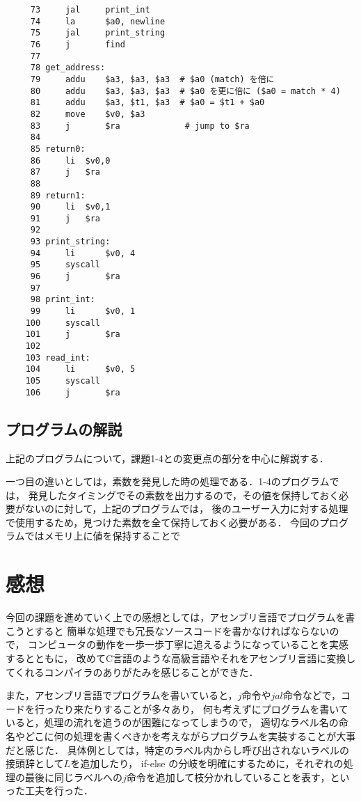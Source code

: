 \documentclass[a4j,11pt]{jarticle}
\begin{document}
\begin{verbatim}
     73	    jal     print_int
     74	    la      $a0, newline
     75	    jal     print_string
     76	    j       find
     77	
     78	get_address:
     79	    addu    $a3, $a3, $a3  # $a0 (match) を倍に
     80	    addu    $a3, $a3, $a3  # $a0 を更に倍に ($a0 = match * 4)
     81	    addu    $a3, $t1, $a3  # $a0 = $t1 + $a0
     82	    move    $v0, $a3
     83	    j		$ra				# jump to $ra
     84	    
     85	return0:
     86		li	$v0,0
     87		j	$ra
     88	
     89	return1:
     90		li	$v0,1
     91		j	$ra
     92	
     93	print_string:
     94	    li      $v0, 4
     95	    syscall
     96	    j       $ra
     97	
     98	print_int:
     99	    li      $v0, 1
    100	    syscall
    101	    j       $ra
    102	
    103	read_int:
    104	    li		$v0, 5
    105	    syscall
    106	    j       $ra 
\end{verbatim}

\subsection{プログラムの解説}
上記のプログラムについて，課題1-4との変更点の部分を中心に解説する．

一つ目の違いとしては，素数を発見した時の処理である．1-4のプログラムでは，
発見したタイミングでその素数を出力するので，その値を保持しておく必要がないのに対して，上記のプログラムでは，
後のユーザー入力に対する処理で使用するため，見つけた素数を全て保持しておく必要がある．
今回のプログラムではメモリ上に値を保持することで

\section{感想}
今回の課題を進めていく上での感想としては，アセンブリ言語でプログラムを書こうとすると
簡単な処理でも冗長なソースコードを書かなければならないので，
コンピュータの動作を一歩一歩丁寧に追えるようになっていることを実感するとともに，
改めてC言語のような高級言語やそれをアセンブリ言語に変換してくれるコンパイラのありがたみを感じることができた．

また，アセンブリ言語でプログラムを書いていると，$j$命令や$jal$命令などで，コードを行ったり来たりすることが多々あり，
何も考えずにプログラムを書いていると，処理の流れを追うのが困難になってしまうので，
適切なラベル名の命名やどこに何の処理を書くべきかを考えながらプログラムを実装することが大事だと感じた．
具体例としては，特定のラベル内からし呼び出されないラベルの接頭辞として$L$を追加したり，
if-else の分岐を明確にするために，それぞれの処理の最後に同じラベルへの$j$命令を追加して枝分かれしていることを表す，といった工夫を行った．
\end{document}
